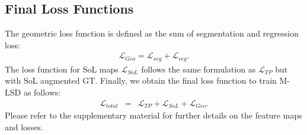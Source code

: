 \documentclass[letterpaper]{article} \usepackage{aaai22}  \usepackage{times}  \usepackage{helvet}  \usepackage{courier}  \usepackage[hyphens]{url}  \usepackage{graphicx} \urlstyle{rm} \def\UrlFont{\rm}  \usepackage{natbib}  \usepackage{caption} \DeclareCaptionStyle{ruled}{labelfont=normalfont,labelsep=colon,strut=off} \frenchspacing  \setlength{\pdfpagewidth}{8.5in}  \setlength{\pdfpageheight}{11in}  \usepackage{algorithm}
\begin{document}
\begin{comment}
\begin{eqnarray}
L_{length} =\frac{1}{\sum_{p}I(p)}\sum_{p}I(p)\cdot L_1(M(p), \hat{M}(p))
\end{eqnarray}
\begin{eqnarray}
L_{degree} =\frac{1}{\sum_{p}I(p)}\sum_{p}I(p)\cdot L_1(D(p), \hat{D}(p))
\end{eqnarray}
\end{comment}

\subsection{Final Loss Functions}
The geometric loss function is defined as the sum of segmentation and regression loss:
\begin{eqnarray}
\label{eq:geo}
\mathcal L_{Geo} = \mathcal L_{seg} + \mathcal L_{reg}.
\end{eqnarray}
The loss function for SoL maps $\mathcal L_{SoL}$ follows the same formulation as $\mathcal L_{TP}$ but with SoL augmented GT.
Finally, we obtain the final loss function to train M-LSD as follows:
\begin{eqnarray}
\label{eq:total}
\mathcal L_{total} &=& \mathcal L_{TP} + \mathcal L_{SoL} + \mathcal L_{Geo}.
\end{eqnarray}
Please refer to the supplementary material for further details on the feature maps and losses.

\begin{comment}
The loss function for TP maps $\mathcal L_{TP}$ is defined as the sum of center and displacement loss, length and degree regression loss, and a matching loss:
\begin{eqnarray}
\label{eq:tp}
\mathcal L_{TP} = \mathcal L_{center} + \mathcal L_{disp} + \mathcal L_{length} + \mathcal L_{degree} + \mathcal L_{match}.
\end{eqnarray}
The loss function for SoL maps $\mathcal L_{SoL}$ follows the same formulation as Equation~\ref{eq:tp} but with SoL augmented GT.
Finally, we obtain the final loss function $\mathcal L_{total}$ as follows:
\begin{eqnarray}
\label{eq:total}
\mathcal L_{total} &=& \mathcal L_{TP} + \mathcal L_{SoL} + \mathcal L_{seg}.
\end{eqnarray}
As illustrated in Figure~\ref{fig:framework}, $\mathcal L_{TP}$ and $\mathcal L_{SoL}$ each optimizes the line representation maps and $\mathcal L_{seg}$ optimizes the segmentation maps.
\end{comment}
\end{document}
